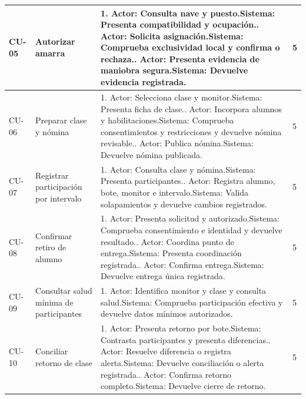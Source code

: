 \begin{longtable}{L{14mm}L{27mm}L{97mm}R{9mm}}
CU-05 & Autorizar amarra & 1. Actor: Consulta nave y puesto.\newline Sistema: Presenta compatibilidad y ocupación.. Actor: Solicita asignación.\newline Sistema: Comprueba exclusividad local y confirma o rechaza.. Actor: Presenta evidencia de maniobra segura.\newline Sistema: Devuelve evidencia registrada. & 5\\\hline
CU-06 & Preparar clase y nómina & 1. Actor: Selecciona clase y monitor.\newline Sistema: Presenta ficha de clase.. Actor: Incorpora alumnos y habilitaciones.\newline Sistema: Comprueba consentimientos y restricciones y devuelve nómina revisable.. Actor: Publica nómina.\newline Sistema: Devuelve nómina publicada. & 5\\\hline
CU-07 & Registrar participación por intervalo & 1. Actor: Consulta clase y nómina.\newline Sistema: Presenta participantes.. Actor: Registra alumno, bote, monitor e intervalo.\newline Sistema: Valida solapamientos y devuelve cambios registrados. & 5\\\hline
CU-08 & Confirmar retiro de alumno & 1. Actor: Presenta solicitud y autorizado.\newline Sistema: Comprueba consentimiento e identidad y devuelve resultado.. Actor: Coordina punto de entrega.\newline Sistema: Presenta coordinación registrada.. Actor: Confirma entrega.\newline Sistema: Devuelve entrega única registrada. & 5\\\hline
CU-09 & Consultar salud mínima de participantes & 1. Actor: Identifica monitor y clase y consulta salud.\newline Sistema: Comprueba participación efectiva y devuelve datos mínimos autorizados. & 5\\\hline
CU-10 & Conciliar retorno de clase & 1. Actor: Presenta retorno por bote.\newline Sistema: Contrasta participantes y presenta diferencias.. Actor: Resuelve diferencia o registra alerta.\newline Sistema: Devuelve conciliación o alerta registrada.. Actor: Confirma retorno completo.\newline Sistema: Devuelve cierre de retorno. & 5\\\hline

\end{longtable}
